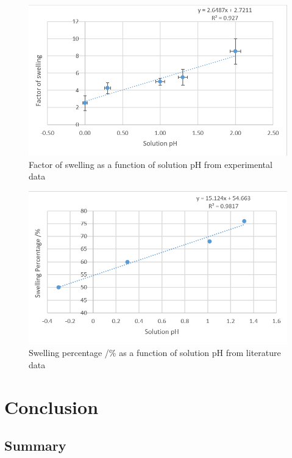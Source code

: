 \documentclass[11pt, letterpaper]{article}
\begin{document}
\begin{paracol}{2}
    \begin{figure}[H]
        \centering
        \includegraphics[width=\linewidth]{experimentalPH.png}
        \caption{Factor of swelling as a function of solution pH from experimental data}
        \label{fig:experimentalPH}
    \end{figure}
    \switchcolumn
    \begin{figure}[H]
        \centering
        \includegraphics[width=\linewidth]{literaturePH.png}
        \caption{Swelling percentage /\% as a function of solution pH from literature data \protect\cite{ramavaraprasadSwellingCharacteristicsSoils2018a}}
        \label{fig:literaturePH}
    \end{figure}
\end{paracol}

\section{Conclusion}

\subsection{Summary}
\end{document}
